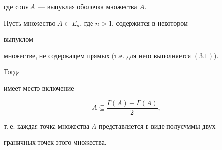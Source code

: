 где $\operatorname{conv} A$ --- выпуклая оболочка множества $A$. 


 


\begin{thm} 


Пусть множество $A\subset E_n$, где $n>1$, содержится в некотором 


выпуклом 


множестве, не содержащем прямых $($т.е. для него выполняется $(3.1))$. 


Тогда 


имеет место включение 


$$ 


A\subseteq\frac{\Gamma(A)+\Gamma(A)}{2}, 


$$ 


т.\,е. каждая точка множества $A$ представляется в виде полусуммы двух 


граничных точек этого множества. 


\end{thm} 


 


